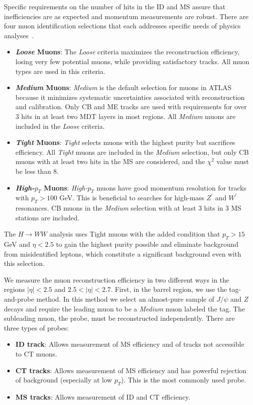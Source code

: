 Specific requirements on the number of hits in the ID and MS assure that inefficiencies are as expected and momentum measurements are robust. There are four muon identification selections that each addresses specific needs of physics analyses~\cite{MCPpaper}.

\begin{itemize}
\item \textbf{\textit{Loose} Muons}: The \textit{Loose} criteria maximizes the reconstruction efficiency, losing very few potential muons, while providing satisfactory tracks. All muon types are used in this criteria.
\item \textbf{\textit{Medium} Muons}: \textit{Medium} is the default selection for muons in ATLAS because it minimizes systematic uncertainties associated with reconstruction and calibration. Only CB and ME tracks are used with requirements for over 3 hits in at least two MDT layers in most regions. All \textit{Medium} muons are included in the \textit{Loose} criteria.
\item \textbf{\textit{Tight} Muons}: \textit{Tight} selects muons with the highest purity but sacrifices efficiency. All \textit{Tight} muons are included in the \textit{Medium} selection, but only CB muons with at least two hits in the MS are considered, and the $\chi^2$ value must be less than $8$.  
\item \textbf{\textit{High-$p_T$} Muons}: \textit{High-$p_T$} muons have good momentum resolution for tracks with $p_T > 100$ GeV. This is beneficial to searches for high-mass $Z^\prime$ and $W^\prime$ resonances. CB muons in the \textit{Medium} selection with at least $3$ hits in $3$ MS stations are included. 
\end{itemize}

The $H\rightarrow WW$ analysis uses Tight muons with the added condition that $p_T>15$ GeV and $\eta<2.5$ to gain the highest purity possible and eliminate background from misidentified leptons, which constitute a significant background even with this selection. 

We measure the muon reconstruction efficiency in two different ways in the regions $|\eta|  < 2.5$ and $2.5 < |\eta|  < 2.7$. First, in the barrel region, we use the tag-and-probe method. In this method we select an almost-pure sample of $J/\psi$ and $Z$ decays and require the leading muon to be a \textit{Medium} muon labeled the tag. The subleading muon, the probe, must be reconstructed independently. There are three types of probes:
\begin{itemize}
\item \textbf{ID track}: Allows measurement of MS efficiency and of tracks not accessible to CT muons. 
\item \textbf{CT tracks}: Allows measurement of MS efficiency and has powerful rejection of background (especially at low $p_T$). This is the most commonly used probe. 
\item \textbf{MS tracks}: Allows measurement of ID and CT efficiency.
\end{itemize}

